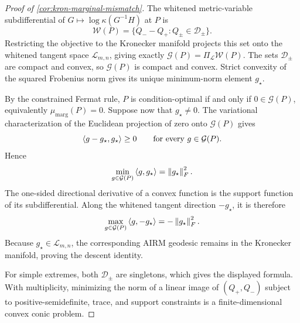 \begin{proof}[Proof of \cref{cor:kron-marginal-mismatch}]
The whitened metric-variable subdifferential of
\(G\mapsto\log\kappa(G^{-1}H)\) at \(P\) is
\[
  \mathcal W(P)
  =
  \{Q_--Q_+:Q_\pm\in\mathcal D_\pm\}.
\]
Restricting the objective to the Kronecker manifold projects this set onto the
whitened tangent space \(\mathcal L_{m,n}\), giving exactly
\(\mathcal G(P)=\Pi_{\mathcal L}\mathcal W(P)\).  The sets
\(\mathcal D_\pm\) are compact and convex, so \(\mathcal G(P)\) is compact
and convex.  Strict convexity of the squared Frobenius norm gives its unique
minimum-norm element \(g_\star\).

By the constrained Fermat rule, \(P\) is condition-optimal if and only if
\(0\in\mathcal G(P)\), equivalently \(\mu_{\mathrm{marg}}(P)=0\).  Suppose
now that \(g_\star\ne0\).  The variational characterization of the Euclidean
projection of zero onto \(\mathcal G(P)\) gives
\[
  \left\langle g-g_\star,g_\star\right\rangle\ge0
  \qquad\text{for every }g\in\mathcal G(P).
\]
Hence
\[
  \min_{g\in\mathcal G(P)}\left\langle g,g_\star\right\rangle
  =\left\lVert g_\star\right\rVert_F^2.
\]
The one-sided directional derivative of a convex function is the support
function of its subdifferential.  Along the whitened tangent direction
\(-g_\star\), it is therefore
\[
  \max_{g\in\mathcal G(P)}\left\langle g,-g_\star\right\rangle
  =-\left\lVert g_\star\right\rVert_F^2.
\]
Because \(g_\star\in\mathcal L_{m,n}\), the corresponding AIRM geodesic
remains in the Kronecker manifold, proving the descent identity.

For simple extremes, both \(\mathcal D_\pm\) are singletons, which gives the
displayed formula.  With multiplicity, minimizing the norm of a linear image
of \((Q_+,Q_-)\) subject to positive-semidefinite, trace, and support
constraints is a finite-dimensional convex conic problem.
\end{proof}

